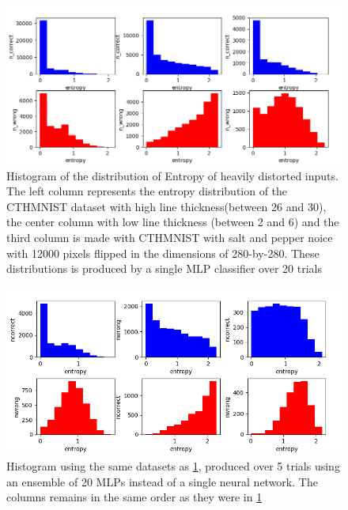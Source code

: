 \begin{figure}
    \centering
    \includegraphics[scale=0.65]{figure/histHighEntropy.png}
    \caption{Histogram of the distribution of Entropy of heavily distorted inputs. The left column represents the entropy distribution of the CTHMNIST dataset with high line thickness(between 26 and 30), the center column with low line thickness (between 2 and 6) and the third column is made with CTHMNIST with salt and pepper noice with 12000 pixels flipped in the dimensions of 280-by-280. These distributions is produced by a single MLP classifier over 20 trials}
    \label{fig:hist4}
\end{figure}

\begin{figure}
    \centering
    \includegraphics[scale=0.7]{figure/histHighEntropyEnsemble.png}
    \caption{Histogram using the same datasets as \ref{fig:hist4}, produced over 5 trials using an ensemble of 20 MLPs instead of a single neural network. The columns remains in the same order as they were in \ref{fig:hist4}}
    \label{fig:hist4ensemble}
\end{figure}